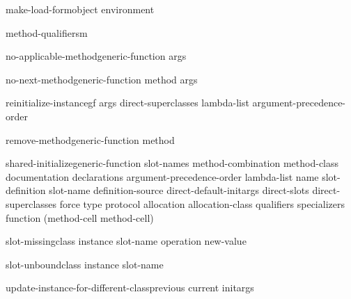 \documentclass[10pt,english]{book}
\begin{document}
\begin{generic}{make-load-form}{object \op environment}
  
\end{generic}

\begin{generic}{method-qualifiers}{m}
  
\end{generic}

\begin{generic}{no-applicable-method}{generic-function \rest args}
  
\end{generic}

\begin{generic}{no-next-method}{generic-function method \rest args}
  
\end{generic}

\begin{generic}{reinitialize-instance}{gf \rest args \key direct-superclasses lambda-list argument-precedence-order
 \akeys}
  
\end{generic}

\begin{generic}{remove-method}{generic-function method}
  
\end{generic}

\begin{generic}{shared-initialize}{generic-function slot-names \key method-combination method-class documentation
 declarations argument-precedence-order lambda-list name slot-definition
 slot-name definition-source direct-default-initargs direct-slots
 direct-superclasses force type protocol allocation allocation-class qualifiers
 specializers function (method-cell method-cell) \akeys}
  
\end{generic}

\begin{generic}{slot-missing}{class instance slot-name operation \op new-value}
  
\end{generic}

\begin{generic}{slot-unbound}{class instance slot-name}
  
\end{generic}

\begin{generic}{update-instance-for-different-class}{previous current \rest initargs}
  
\end{generic}
\end{document}
